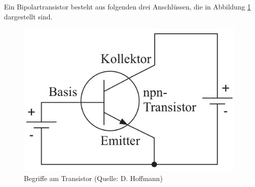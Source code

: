 Ein Bipolartransistor besteht aus folgenden drei Anschlüssen, die in Abbildung \ref{Abb:Bipolartransistor} dargestellt sind.


\begin{figure}[h]
\begin{sich}
\begin{center}
\includegraphics[scale=.4]{pics/transistorbegriffe}
\caption{Begriffe am Transistor (Quelle: D. Hoffmann)}
\label{Abb:Bipolartransistor}
\end{center}
\end{sich}
\end{figure}


